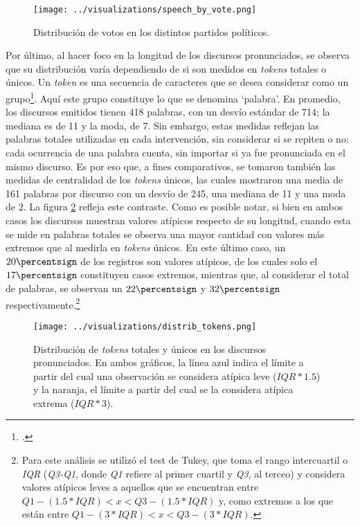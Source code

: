 \begin{figure}[h!]
    \centering
    \texttt{[image: ../visualizations/speech\_by\_vote.png]}
    \caption{Distribuci\'on de votos en los distintos partidos pol\'iticos.}%
    \label{fig-distrib-speech}
\end{figure}

Por \'ultimo, al hacer foco en la longitud de los discursos pronunciados, se observa que su
distribuci\'on var\'ia dependiendo de si son medidos en \textit{tokens} totales o \'unicos.
Un \textit{token} es una secuencia de caracteres que se desea considerar como un
grupo\footnote{\citet*{bird2009natural}.}. Aqu\'i este grupo constituye lo que se denomina
`palabra'. En promedio, los discursos emitidos tienen 418 palabras, con un desv\'io
est\'andar de 714; la mediana es de 11 y la moda, de 7. Sin embargo, estas medidas
reflejan las palabras totales utilizadas en cada intervenci\'on, sin considerar si se repiten
o no: cada ocurrencia de una palabra cuenta, sin importar si ya fue pronunciada en el mismo
discurso. Es por eso que, a fines comparativos, se tomaron tambi\'en las medidas de centralidad
de los \textit{tokens} \'unicos, las cuales mostraron una media de 161 palabras por discurso
con un desv\'io de 245, una mediana de 11 y una moda de 2. La figura \ref{fig-distrib-tokens}
refleja este contraste. Como es posible notar, si bien en ambos casos los discursos
muestran valores at\'ipicos respecto de su longitud, cuando esta se mide en palabras
totales se observa una mayor cantidad con valores m\'as extremos que
al medirla en \textit{tokens} \'unicos. En este \'ultimo caso, un
$20\percentsign$ de los registros son valores at\'ipicos, de los cuales solo el
$17\percentsign$ constituyen casos extremos, mientras que, al considerar
el total de palabras, se observan un $22\percentsign$ y $32\percentsign$
respectivamente.\footnote{Para este an\'alisis se utiliz\'o el
test de Tukey, que toma el rango intercuartil o \textit{IQR} (\textit{Q3-Q1}, donde
\textit{Q1} refiere al primer cuartil y \textit{Q3}, al terceo) y considera
valores at\'ipicos leves a aquellos que se encuentran entre
$Q1 - (1.5 * IQR) < x < Q3 - (1.5 * IQR)$ y, como extremos a los que est\'an entre
$Q1 - (3 * IQR) < x < Q3 - (3 * IQR)$.}

\begin{figure}[h!]%
    \centering%
    \texttt{[image: ../visualizations/distrib\_tokens.png]}%
    \caption{Distribuci\'on de \textit{tokens} totales y \'unicos en los discursos pronunciados. En ambos gr\'aficos,
    la l\'inea azul indica el l\'imite a partir del cual una observaci\'on se considera at\'ipica leve
    ($IQR*1.5$) y la naranja, el l\'imite a partir del cual se la considera at\'ipica extrema ($IQR*3$).}%
    \label{fig-distrib-tokens}%
\end{figure}%
